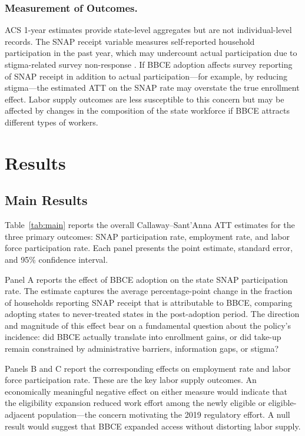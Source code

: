 \documentclass[12pt]{article}
\begin{document}
\subsubsection*{Measurement of Outcomes.} ACS 1-year estimates provide state-level aggregates but are not individual-level records. The SNAP receipt variable measures self-reported household participation in the past year, which may undercount actual participation due to stigma-related survey non-response \citep{meyer2015household}. If BBCE adoption affects survey reporting of SNAP receipt in addition to actual participation---for example, by reducing stigma---the estimated ATT on the SNAP rate may overstate the true enrollment effect. Labor supply outcomes are less susceptible to this concern but may be affected by changes in the composition of the state workforce if BBCE attracts different types of workers.

\section{Results}

\subsection{Main Results}

Table~\ref{tab:main} reports the overall Callaway--Sant'Anna ATT estimates for the three primary outcomes: SNAP participation rate, employment rate, and labor force participation rate. Each panel presents the point estimate, standard error, and 95\% confidence interval.



Panel A reports the effect of BBCE adoption on the state SNAP participation rate. The estimate captures the average percentage-point change in the fraction of households reporting SNAP receipt that is attributable to BBCE, comparing adopting states to never-treated states in the post-adoption period. The direction and magnitude of this effect bear on a fundamental question about the policy's incidence: did BBCE actually translate into enrollment gains, or did take-up remain constrained by administrative barriers, information gaps, or stigma?

Panels B and C report the corresponding effects on employment rate and labor force participation rate. These are the key labor supply outcomes. An economically meaningful negative effect on either measure would indicate that the eligibility expansion reduced work effort among the newly eligible or eligible-adjacent population---the concern motivating the 2019 regulatory effort. A null result would suggest that BBCE expanded access without distorting labor supply.
\end{document}
